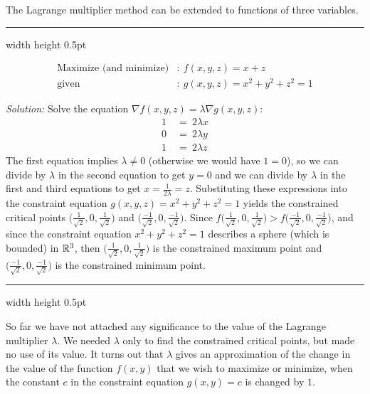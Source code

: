 The Lagrange multiplier method can be extended to functions of three variables.

\medskip
\hrule width \textwidth height 0.5pt
\begin{exmp}
 \begin{align*}
  \text{Maximize (and minimize)}&: ~ f(x,y,z) = x+z\\
  \text{given}&: ~ g(x,y,z) = x^2 + y^2 + z^2 = 1
 \end{align*}
 \par\noindent \emph{Solution:} Solve the equation $\nabla f(x,y,z) = \lambda \nabla g(x,y,z)$:
 \begin{align*}
  1 ~&=~ 2\lambda x\\
  0 ~&=~ 2\lambda y\\
  1 ~&=~ 2\lambda z
 \end{align*}
 The first equation implies $\lambda \ne 0$ (otherwise we would have $1=0$), so we can divide by $\lambda$ in the
 second equation to get $y=0$ and we can divide by $\lambda$ in the first and third equations to get
 $x=\frac{1}{2\lambda}=z$. Substituting these expressions into the constraint equation $g(x,y,z) = x^2 + y^2 + z^2 = 1$
 yields the constrained critical points $\biggl( \frac{1}{\sqrt{2}},0,\frac{1}{\sqrt{2}} \biggr)$ and
 $\biggl( \frac{-1}{\sqrt{2}},0,\frac{-1}{\sqrt{2}} \biggr)$. Since $f\biggl( \frac{1}{\sqrt{2}},0,\frac{1}{\sqrt{2}}
 \biggr) > f\biggl( \frac{-1}{\sqrt{2}},0,\frac{-1}{\sqrt{2}} \biggr)$, and since the constraint equation
 $x^2 + y^2 + z^2 = 1$ describes a sphere (which is bounded) in $\mathbb{R}^{3}$, then
 $\biggl( \frac{1}{\sqrt{2}},0,\frac{1}{\sqrt{2}} \biggr)$ is the constrained maximum point and
 $\biggl( \frac{-1}{\sqrt{2}},0,\frac{-1}{\sqrt{2}} \biggr)$ is the constrained minimum point.
\end{exmp}
\hrule width \textwidth height 0.5pt
\medskip

So far we have not attached any significance to the value of the Lagrange multiplier $\lambda$. 
We needed $\lambda$ only to find the constrained critical points, but made no use of its value. 
It turns out that $\lambda$ gives an approximation of the change in the value of the function $f(x,y)$ that we wish to maximize or minimize, when
the constant $c$ in the constraint equation $g(x,y)=c$ is changed by $1$.

